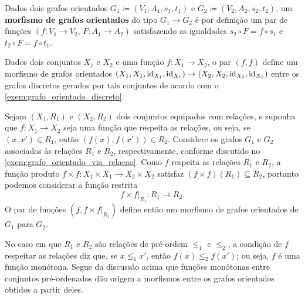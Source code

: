 \begin{defin}\label{defin:morfismo_grafos_orientados}
    Dados dois grafos orientados $G_1 \coloneqq (V_1,A_1,s_1,t_1)$ e $G_2 \coloneqq (V_2,A_2,s_2,t_2)$, um \textbf{morfismo de grafos orientados} do tipo $G_1 \to G_2$ é por definição um par de funções $(f: V_1 \to V_2,\, F: A_1 \to A_2)$ satisfazendo as igualdades $s_2 \circ F = f \circ s_1$ e $t_2 \circ F = f \circ t_1$.
\end{defin}

\begin{exem}
    Dados dois conjuntos $X_1$ e $X_2$ e uma função $f: X_1 \to X_2$, o par $(f,f)$ define um morfismo de grafos orientados $(X_1,X_1,\mathrm{id}_{X_1},\mathrm{id}_{X_1}) \to (X_2,X_2,\mathrm{id}_{X_2},\mathrm{id}_{X_2})$ entre os grafos discretos gerados por tais conjuntos de acordo com o \cref{exem:grafo_orientado_discreto}.
\end{exem}

\begin{exem}
    Sejam $(X_1,R_1)$ e $(X_2,R_2)$ dois conjuntos equipados com relações, e suponha que $f: X_1 \to X_2$ seja uma função que respeita as relações, ou seja, se $(x,x') \in R_1$, então $(f(x),f(x')) \in R_2$.
    Considere os grafos $G_1$ e $G_2$ associados às relações $R_1$ e $R_2$, respectivamente, conforme discutido no \cref{exem:grafo_orientado_via_relacao}.
    Como $f$ respeita as relações $R_1$ e $R_2$, a função produto $f \times f: X_1 \times X_1 \to X_2 \times X_2$ satisfaz $(f \times f)(R_1) \subseteq R_2$, portanto podemos considerar a função restrita
    \begin{displaymath}
        f \times f \rvert_{R_1}: R_1 \to R_2.
    \end{displaymath}
    O par de funções $(f,f \times f\rvert_{R_1})$ define então um morfismo de grafos orientados de $G_1$ para $G_2$.

    No caso em que $R_1$ e $R_2$ são relações de pré-ordem $\leq_1$ e $\leq_2$, a condição de $f$ respeitar as relações diz que, se $x \leq_1 x'$, então $f(x) \leq_2 f(x')$; ou seja, $f$ é uma função monótona.
    Segue da discussão acima que funções monótonas entre conjuntos pré-ordenados dão origem a morfismos entre os grafos orientados obtidos a partir deles.
\end{exem}

